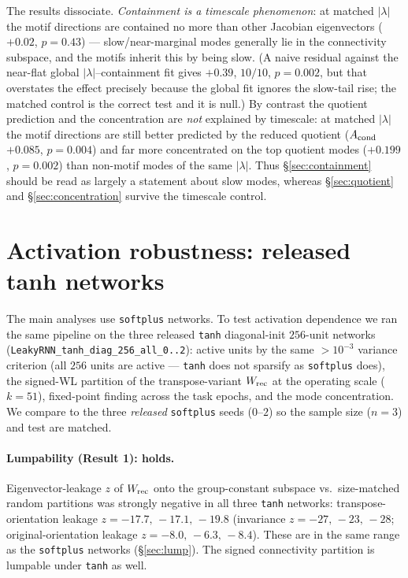 \documentclass[11pt]{article}
\begin{document}
The results dissociate. \emph{Containment is a timescale phenomenon}: at matched
$\lvert\lambda\rvert$ the motif directions are contained no more than other Jacobian eigenvectors
($+0.02$, $p=0.43$) --- slow/near-marginal modes generally lie in the connectivity subspace, and the
motifs inherit this by being slow. (A naive residual against the near-flat global
$\lvert\lambda\rvert$--containment fit gives $+0.39$, $10/10$, $p=0.002$, but that overstates the
effect precisely because the global fit ignores the slow-tail rise; the matched control is the
correct test and it is null.) By contrast the quotient prediction and the concentration are
\emph{not} explained by timescale: at matched $\lvert\lambda\rvert$ the motif directions are still
better predicted by the reduced quotient ($A_{\rm cond}$ $+0.085$, $p=0.004$) and far more
concentrated on the top quotient modes ($+0.199$, $p=0.002$) than non-motif modes of the same
$\lvert\lambda\rvert$. Thus \S\ref{sec:containment} should be read as largely a statement about slow
modes, whereas \S\ref{sec:quotient} and \S\ref{sec:concentration} survive the timescale control.

\section{Activation robustness: released tanh networks}
\label{sec:tanh}
The main analyses use \texttt{softplus} networks. To test activation dependence we ran the same
pipeline on the three released \texttt{tanh} diagonal-init $256$-unit networks
(\texttt{LeakyRNN\_tanh\_diag\_256\_all\_0..2}): active units by the same $>10^{-3}$ variance
criterion (all $256$ units are active --- \texttt{tanh} does not sparsify as \texttt{softplus}
does), the signed-WL partition of the transpose-variant $W_{\rm rec}$ at the operating scale
($k=51$), fixed-point finding across the task epochs, and the mode concentration. We compare to the
three \emph{released} \texttt{softplus} seeds ($0$--$2$) so the sample size ($n=3$) and test are
matched.

\paragraph{Lumpability (Result 1): holds.} Eigenvector-leakage $z$ of $W_{\rm rec}$ onto the
group-constant subspace vs.\ size-matched random partitions was strongly negative in all three
\texttt{tanh} networks: transpose-orientation leakage $z=-17.7,\,-17.1,\,-19.8$ (invariance
$z=-27,\,-23,\,-28$; original-orientation leakage $z=-8.0,\,-6.3,\,-8.4$). These are in the same
range as the \texttt{softplus} networks (\S\ref{sec:lump}). The signed connectivity partition is
lumpable under \texttt{tanh} as well.
\end{document}

